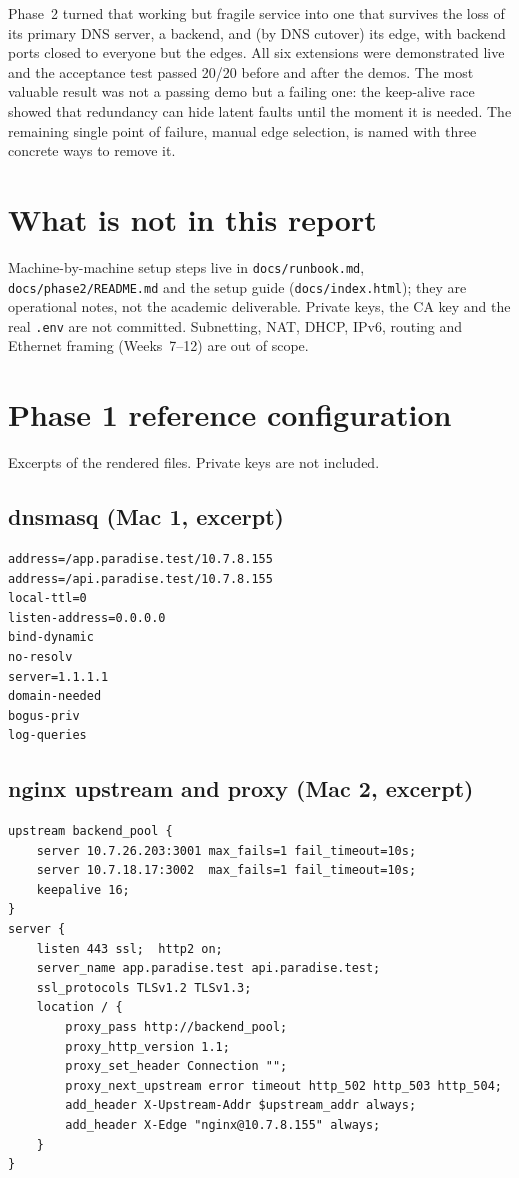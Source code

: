 \documentclass[11pt,a4paper]{article}
\begin{document}
Phase~2 turned that working but fragile service into one that survives the loss of its primary
DNS server, a backend, and (by DNS cutover) its edge, with backend ports closed to everyone but the
edges. All six extensions were demonstrated live and the acceptance test passed 20/20 before and
after the demos. The most valuable result was not a passing demo but a failing one: the keep-alive
race showed that redundancy can hide latent faults until the moment it is needed. The remaining
single point of failure, manual edge selection, is named with three concrete ways to remove it.

\section{What is not in this report}
Machine-by-machine setup steps live in \texttt{docs/runbook.md}, \texttt{docs/phase2/README.md} and
the setup guide (\texttt{docs/index.html}); they are operational notes, not the academic
deliverable. Private keys, the CA key and the real \texttt{.env} are not committed.
Subnetting, NAT, DHCP, IPv6, routing and Ethernet framing (Weeks~7--12) are out of scope.

\clearpage
\appendix
\section{Phase 1 reference configuration}
Excerpts of the rendered files. Private keys are not included.

\subsection{dnsmasq (Mac 1, excerpt)}
\par\noindent\begin{minipage}{\linewidth}
\begin{lstlisting}
address=/app.paradise.test/10.7.8.155
address=/api.paradise.test/10.7.8.155
local-ttl=0
listen-address=0.0.0.0
bind-dynamic
no-resolv
server=1.1.1.1
domain-needed
bogus-priv
log-queries
\end{lstlisting}
\end{minipage}\par

\subsection{nginx upstream and proxy (Mac 2, excerpt)}
\begin{lstlisting}
upstream backend_pool {
    server 10.7.26.203:3001 max_fails=1 fail_timeout=10s;
    server 10.7.18.17:3002  max_fails=1 fail_timeout=10s;
    keepalive 16;
}
server {
    listen 443 ssl;  http2 on;
    server_name app.paradise.test api.paradise.test;
    ssl_protocols TLSv1.2 TLSv1.3;
    location / {
        proxy_pass http://backend_pool;
        proxy_http_version 1.1;
        proxy_set_header Connection "";
        proxy_next_upstream error timeout http_502 http_503 http_504;
        add_header X-Upstream-Addr $upstream_addr always;
        add_header X-Edge "nginx@10.7.8.155" always;
    }
}
\end{lstlisting}
\end{document}
